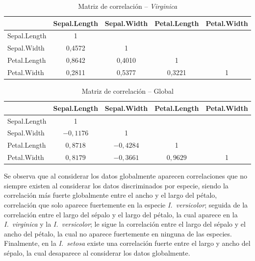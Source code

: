 \documentclass[12pt,a4paper]{article}
\begin{document}
\begin{table}[h!]
\centering
\caption{Matriz de correlación -- \textit{Virginica}}
\label{fig:corr_virginica}
\begin{tabular}{lcccc}
\toprule
 & \textbf{Sepal.Length} & \textbf{Sepal.Width} & \textbf{Petal.Length} & \textbf{Petal.Width} \\
\midrule
Sepal.Length & 1          &            &            &   \\
Sepal.Width  & 0,4572     & 1          &            &   \\
Petal.Length & 0,8642     & 0,4010     & 1          &   \\
Petal.Width  & 0,2811     & 0,5377     & 0,3221     & 1 \\
\bottomrule
\end{tabular}
\end{table}

\begin{table}[h!]
\centering
\caption{Matriz de correlación -- Global}
\label{fig:corr_global}
\begin{tabular}{lcccc}
\toprule
 & \textbf{Sepal.Length} & \textbf{Sepal.Width} & \textbf{Petal.Length} & \textbf{Petal.Width} \\
\midrule
Sepal.Length & 1           &             &            &   \\
Sepal.Width  & $-0,1176$   & 1           &            &   \\
Petal.Length & $0,8718$    & $-0,4284$   & 1          &   \\
Petal.Width  & $0,8179$    & $-0,3661$   & $0,9629$   & 1 \\
\bottomrule
\end{tabular}
\end{table}

Se observa que al considerar los datos globalmente aparecen correlaciones que no siempre existen al considerar los datos discriminados por especie, siendo la correlación más fuerte globalmente entre el ancho y el largo del pétalo, correlación que solo aparece fuertemente en la especie \textit{I.~versicolor}; seguida de la correlación entre el largo del sépalo y el largo del pétalo, la cual aparece en la \textit{I.~virginica} y la \textit{I.~versicolor}; le sigue la correlación entre el largo del sépalo y el ancho del pétalo, la cual no aparece fuertemente en ninguna de las especies. Finalmente, en la \textit{I.~setosa} existe una correlación fuerte entre el largo y ancho del sépalo, la cual desaparece al considerar los datos globalmente.
\end{document}

